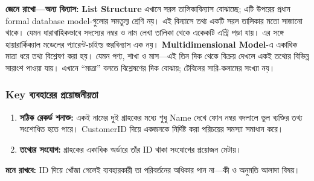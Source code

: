 \textbf{জেনে রাখো—অন্য বিন্যাস:}
\textbf{List Structure} এখানে সরল তালিকাবিন্যাস বোঝাচ্ছে; এটি উপরের প্রধান formal database model-গুলোর সমতুল্য শ্রেণি নয়। এই বিন্যাসে তথ্য একটি সরল তালিকার মতো সাজানো থাকে। যেমন ধারাবাহিকভাবে সদস্যের নম্বর ও নাম লেখা তালিকা থেকে একেকটি এন্ট্রি পড়া যায়। এর সঙ্গে হায়ারার্কিক্যাল মডেলের প্যারেন্ট-চাইল্ড স্তরবিন্যাস এক নয়। \textbf{Multidimensional Model}-এ একাধিক মাত্রা ধরে তথ্য বিশ্লেষণ করা হয়। যেমন পণ্য, শাখা ও মাস---এই তিন দিক থেকে বিক্রয় দেখলে একই তথ্যের বিভিন্ন সারাংশ পাওয়া যায়। এখানে ``মাত্রা'' বলতে বিশ্লেষণের দিক বোঝায়; টেবিলের সারি-কলামের সংখ্যা নয়।

\subsubsection{Key ব্যবহারের প্রয়োজনীয়তা}
\begin{enumerate}
\item \textbf{সঠিক রেকর্ড শনাক্ত:} একই নামের দুই গ্রাহকের মধ্যে শুধু Name দেখে ফোন নম্বর বদলালে ভুল ব্যক্তির তথ্য সংশোধিত হতে পারে। CustomerID দিয়ে একজনকে নির্দিষ্ট করা পরিচয়ের সমস্যা সমাধান করে।
\item \textbf{তথ্যের সংযোগ:} গ্রাহকের একাধিক অর্ডারে তাঁর ID থাকা সংযোগের প্রয়োজন মেটায়।
\end{enumerate}
\textbf{মনে রাখবে:} ID দিয়ে খোঁজা গেলেই ব্যবহারকারী তা পরিবর্তনের অধিকার পান না—কী ও অনুমতি আলাদা বিষয়।

